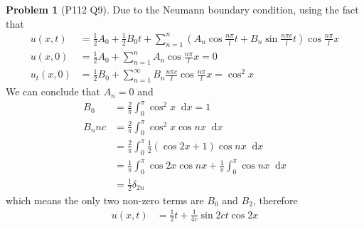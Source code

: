 \documentclass[twoside,11pt]{article}
\renewcommand*\d{\mathop{}\!\mathrm{d}}
\theoremstyle{definition}
\newtheorem{problem}{Problem}
\theoremstyle{remark}
\begin{document}
\begin{problem}[P112 Q9]
Due to the Neumann boundary condition, using the fact that
\begin{align*}
    u(x, t) &= \frac{1}{2}A_0 + \frac{1}{2}B_0 t + 
    \sum_{n=1}^n \left(
        A_n\cos\frac{n\pi}{l}t + B_n\sin\frac{n\pi c}{l}t
    \right)\cos\frac{n\pi}{l}x\\
    u(x, 0) &= \frac{1}{2}A_0 + \sum_{n=1}^n A_n\cos\frac{n\pi}{l}x = 0\\
    u_t(x, 0) &= \frac{1}{2}B_0 + \sum_{n=1}^\infty B_n\frac{n\pi c}{l}\cos\frac{n\pi}{l}x
    =\cos^2 x
\end{align*}
We can conclude that $A_n=0$ and
\begin{align*}
    B_0 &= \frac{2}{\pi}\int_0^\pi \cos^2 x\d x = 1\\
    B_n nc &= \frac{2}{\pi}\int_0^\pi \cos^2 x \cos nx\d x \\
    &= \frac{2}{\pi}\int_0^\pi \frac{1}{2}(\cos 2x + 1)\cos nx \d x\\
    &= \frac{1}{\pi}\int_0^\pi \cos 2x \cos nx + \frac{1}{\pi}\int_0^\pi\cos nx \d x\\
    &= \frac{1}{2}\delta_{2n}
\end{align*}
which means the only two non-zero terms are $B_0$ and $B_2$, therefore
\begin{align*}
    u(x,t) &= \frac{1}{2}t + \frac{1}{4c}\sin 2ct\cos 2x
\end{align*}

\end{problem}



\end{document}
